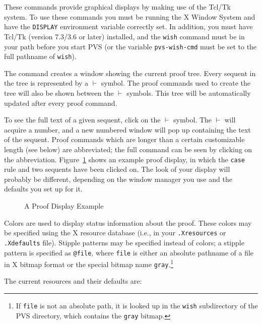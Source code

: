 These commands provide graphical displays by making use of the
Tcl/Tk~\cite{Tcl/TK} system.  To use these commands you must be running
the X Window System and have the
\texttt{DISPLAY} environment variable correctly set.
In addition, you must have Tcl/Tk (version 7.3/3.6 or later)
installed, and the \texttt{wish} command must be in your path before you
start PVS (or the variable \texttt{pvs-wish-cmd} must be set to the full
pathname of \texttt{wish}).  

The  command creates a window showing the
cur\-rent proof tree.  Every sequent in the tree is represented by a
$\vdash$ symbol.  The proof commands used to create
the tree will also be shown between the $\vdash$ symbols.  This tree will
be automatically updated after every proof command.

To see the full text of a given sequent, click on the $\vdash$ symbol.
The $\vdash$ will acquire a number, and a new numbered window will pop up
containing the text of the sequent.  Proof commands which are longer than
a certain customizable length (see below) are abbreviated; the full
command can be seen by clicking on the abbreviation.
Figure~\ref{proofwindow} shows an example proof display, in which the
\texttt{case} rule and two sequents have been clicked on.  The look of
your display will probably be different, depending on the window manager
you use and the defaults you set up for it.

\begin{figure}
\vspace{8in}
\caption{A Proof Display Example}\label{proofwindow}
\end{figure}

Colors are used to display status information about the proof.  These
colors may be specified using the X resource database (i.e., in your
\texttt{.Xresources} or \texttt{.Xdefaults} file).  Stipple patterns may
be specified instead of colors; a stipple pattern is specified as
\texttt{@file}, where \texttt{file} is either an absolute pathname of a
file in X bitmap format or the special bitmap name
\texttt{gray}.\footnote{If \texttt{file} is not an absolute path, it is
looked up in the \texttt{wish} subdirectory of the PVS directory, which
contains the \texttt{gray} bitmap.}

The current resources and their defaults are:

